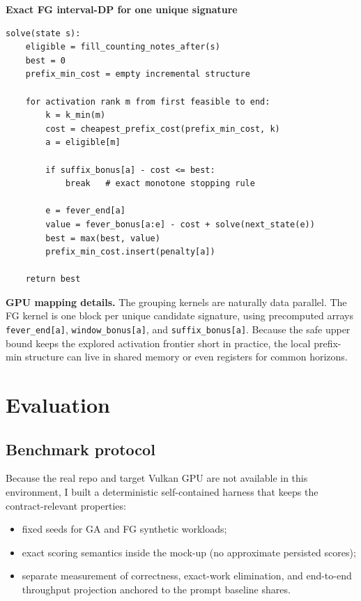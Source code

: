 \documentclass[11pt]{article}
\begin{document}
\textbf{Exact FG interval-DP for one unique signature}

\begin{lstlisting}
solve(state s):
    eligible = fill_counting_notes_after(s)
    best = 0
    prefix_min_cost = empty incremental structure

    for activation rank m from first feasible to end:
        k = k_min(m)
        cost = cheapest_prefix_cost(prefix_min_cost, k)
        a = eligible[m]

        if suffix_bonus[a] - cost <= best:
            break   # exact monotone stopping rule

        e = fever_end[a]
        value = fever_bonus[a:e] - cost + solve(next_state(e))
        best = max(best, value)
        prefix_min_cost.insert(penalty[a])

    return best
\end{lstlisting}

\textbf{GPU mapping details.}
The grouping kernels are naturally data parallel. The FG kernel is one block per unique candidate signature, using precomputed arrays \texttt{fever\_end[a]}, \texttt{window\_bonus[a]}, and \texttt{suffix\_bonus[a]}. Because the safe upper bound keeps the explored activation frontier short in practice, the local prefix-min structure can live in shared memory or even registers for common horizons.

\section{Evaluation}

\subsection{Benchmark protocol}

Because the real repo and target Vulkan GPU are not available in this environment, I built a deterministic self-contained harness that keeps the contract-relevant properties:
\begin{itemize}
    \item fixed seeds for GA and FG synthetic workloads;
    \item exact scoring semantics inside the mock-up (no approximate persisted scores);
    \item separate measurement of correctness, exact-work elimination, and end-to-end throughput projection anchored to the prompt baseline shares.
\end{itemize}
\end{document}
